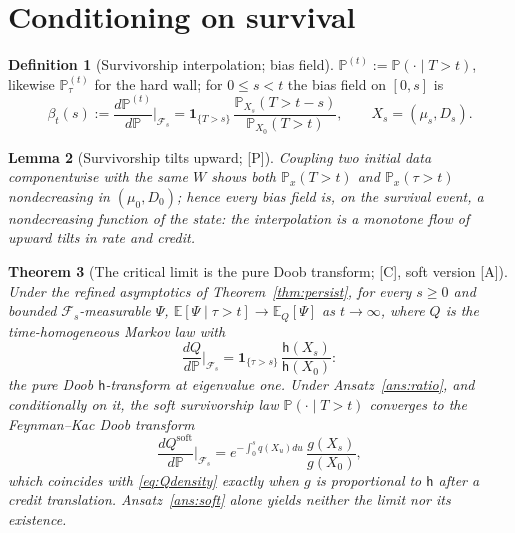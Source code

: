 \documentclass[11pt]{article}
\newtheorem{theorem}{Theorem}[section]
\newtheorem{lemma}[theorem]{Lemma}
\theoremstyle{definition}
\newtheorem{definition}[theorem]{Definition}
\theoremstyle{remark}
\newcommand{\PP}{\mathbb{P}}
\newcommand{\E}{\mathbb{E}}
\newcommand{\one}{\mathbf{1}}
\newcommand{\hm}{\mathsf{h}}
\newcommand{\Fc}{\mathcal{F}}
\begin{document}
\section{Conditioning on survival}\label{sec:cond}

\begin{definition}[Survivorship interpolation; bias field]
\label{def:interp}
$\PP^{(t)}:=\PP(\cdot\mid T>t)$, likewise $\PP^{(t)}_\tau$ for the
hard wall; for $0\le s<t$ the bias field on $[0,s]$ is
\begin{equation}\label{eq:bias}
\beta_t(s):=\frac{d\PP^{(t)}}{d\PP}\Big|_{\Fc_s}
=\one_{\{T>s\}}\,\frac{\PP_{X_s}(T>t-s)}{\PP_{X_0}(T>t)},
\qquad X_s=(\mu_s,D_s).
\end{equation}
\end{definition}

\begin{lemma}[Survivorship tilts upward; {[P]}]\label{lem:monotone}
Coupling two initial data componentwise with the same $W$ shows both
$\PP_x(T>t)$ and $\PP_x(\tau>t)$ nondecreasing in $(\mu_0,D_0)$;
hence every bias field is, on the survival event, a nondecreasing
function of the state: the interpolation is a monotone flow of upward
tilts in rate and credit.
\end{lemma}

\begin{theorem}[The critical limit is the pure Doob transform;
{[C]}, soft version {[A]}]\label{thm:Q}
Under the refined asymptotics of Theorem~\ref{thm:persist}, for every
$s\ge0$ and bounded $\Fc_s$-measurable $\Psi$,
$\E[\Psi\mid\tau>t]\to\E_Q[\Psi]$ as $t\to\infty$, where $Q$ is the
time-homogeneous Markov law with
\begin{equation}\label{eq:Qdensity}
\frac{dQ}{d\PP}\Big|_{\Fc_s}
=\one_{\{\tau>s\}}\,\frac{\hm(X_s)}{\hm(X_0)}:
\end{equation}
the pure Doob $\hm$-transform at eigenvalue one. Under
Ansatz~\ref{ans:ratio}, and conditionally on it, the soft
survivorship law $\PP(\cdot\mid T>t)$ converges to the Feynman--Kac
Doob transform
\begin{equation}\label{eq:Qsoft}
\frac{dQ^{\mathrm{soft}}}{d\PP}\Big|_{\Fc_s}
=e^{-\int_0^sq(X_u)du}\,\frac{g(X_s)}{g(X_0)},
\end{equation}
which coincides with \eqref{eq:Qdensity} exactly when $g$ is
proportional to $\hm$ after a credit translation. Ansatz~\ref{ans:soft}
alone yields neither the limit nor its existence.
\end{theorem}
\end{document}
